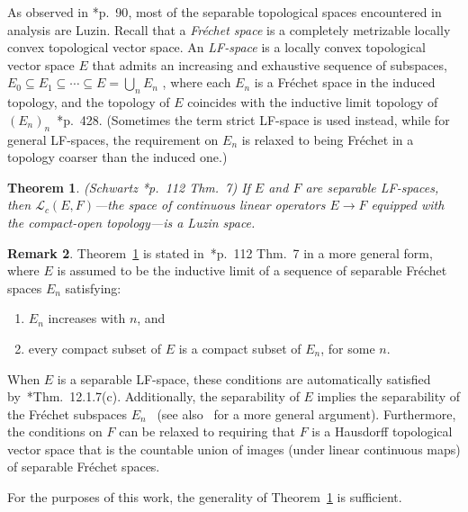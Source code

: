 \documentclass[12pt]{paper}
\numberwithin{equation}{section}
\theoremstyle{plain}
\newtheorem{theorem}{Theorem}[section]
\theoremstyle{definition}
\newtheorem{remark}[theorem]{Remark}
\begin{document}
As observed in \cite{schwartzRadonMeasuresArbitrary1973}*{p.~90}, most of the separable topological
spaces encountered in analysis are Luzin.  Recall that a \emph{Fr\'echet space} is a completely
metrizable locally convex topological vector space.  An \emph{LF-space} is a locally convex
topological vector space \(E\) that admits an increasing and exhaustive sequence of subspaces,
\(E_{0} \subseteq E_{1} \subseteq \cdots \subseteq E = \bigcup_{n} E_{n}\) , where each \(E_{n}\) is
a Fr\'echet space in the induced topology, and the topology of \(E\) coincides with the inductive
limit topology of \((E_{n})_{n}\)~\cite{nariciTopologicalVectorSpaces2010}*{p.~428}.  (Sometimes the
term strict LF-space is used instead, while for general LF-spaces, the requirement on \(E_{n}\) is
relaxed to being Fr\'echet in a topology coarser than the induced one.)

\begin{theorem}(Schwartz \cite{schwartzRadonMeasuresArbitrary1973}*{p.~112 Thm.~7})
  \label{thm:schwartz}
  If \(E\) and \(F\) are separable LF-spaces, then \(\mathcal{L}_{c}(E,F)\)---the space of
  continuous linear operators \(E \to F\) equipped with the compact-open topology---is a Luzin
  space.
\end{theorem}

\begin{remark}
  Theorem~\ref{thm:schwartz} is stated in~\cite{schwartzRadonMeasuresArbitrary1973}*{p.~112 Thm.~7}
  in a more general form, where \(E\) is assumed to be the inductive limit of a sequence of
  separable Fr\'echet spaces \(E_{n}\) satisfying:
  \begin{enumerate}[leftmargin=1cm, label={\sf \arabic*}., ref={\sf \arabic*}]
  \item \(E_{n}\) increases with \(n\), and
  \item every compact subset of \(E\) is a compact subset of \(E_{n}\), for some \(n\).
  \end{enumerate}
  When \(E\) is a separable LF-space, these conditions are automatically satisfied
  by~\cite{nariciTopologicalVectorSpaces2010}*{Thm.~12.1.7(c)}.  Additionally, the separability of
  \(E\) implies the separability of the Fr\'echet subspaces
  \(E_{n}\)~\cite{vidossichCharacterizationSeparabilityLF1968} (see
  also~\cite{lohmanSeparabilityLinearTopological1974} for a more general argument).  Furthermore,
  the conditions on \(F\) can be relaxed to requiring that \(F\) is a Hausdorff topological vector
  space that is the countable union of images (under linear continuous maps) of separable Fr\'echet
  spaces.

  For the purposes of this work, the generality of Theorem~\ref{thm:schwartz} is sufficient.
\end{remark}
\end{document}
